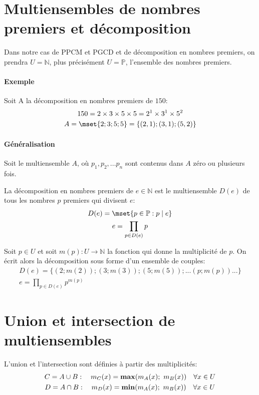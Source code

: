 \section{Multiensembles de nombres premiers et décomposition}
Dans notre cas de PPCM et PGCD et de décomposition en nombres premiers, on prendra $U=\mathbb{N}$, plus précisément $U=\mathbb{P}$, l'ensemble des nombres premiers.

\paragraph{Exemple}
Soit A la décomposition en nombres premiers de $150$:
\begin{gather*}
    150 = 2 \times 3 \times 5 \times 5 = 2^1 \times 3^1 \times 5^2 \\
    A = \mset{2;3;5;5}=\{(2,1);(3,1);(5,2)\}
\end{gather*}

\paragraph{Généralisation}
Soit le multiensemble $A$, où $p_1, p_2, ...p_n$ sont contenus dans $A$ zéro ou plusieurs fois.

La décomposition en nombres premiers de $e \in \mathbb{N}$ est le multiensemble $D(e)$ de tous les nombres $p$ premiers qui divisent $e$:
\begin{gather*}  
    D(e) = \mset{p \in \mathbb{P} : p\mid e } \\
    e = \prod_{p \in D(e)} p \\
\end{gather*}    

Soit $p \in U$ et soit $m(p): U \rightarrow \mathbb{N}$ la fonction qui donne la multiplicité de $p$. On écrit alors la décomposition sous forme d'un ensemble de couples:
\begin{gather*}  
    D(e)=\{(2; m(2)); (3; m(3)); (5; m(5)); ...(p; m(p))...\} \\
    e = \prod_{p \in D(e)} p^{m(p)}
\end{gather*}    

\section{Union et intersection de multiensembles}
L'union et l'intersection sont définies à partir des multiplicités:
\begin{gather*}
    C = A\cup B: \quad m_{C}(x)=\operatorname{\mathbf{max}}(m_{A}(x);\ m_{B}(x))\quad \forall x\in U \\
    D = A\cap B: \quad m_{D}(x)=\operatorname{\mathbf{min}}(m_{A}(x);\ m_{B}(x))\quad \forall x\in U
\end{gather*}

